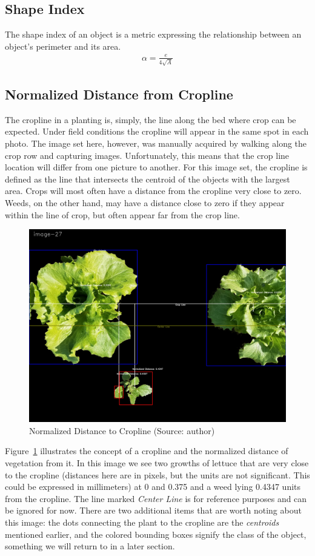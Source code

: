 \documentclass[letterpaper]{article}
\begin{document}
{\subsection{Shape Index}
The shape index of an object is a metric expressing the relationship between an object's perimeter and its area.
\begin{eqnarray*}
\alpha = \frac {e} {4 \sqrt{A}}
\end{eqnarray*}

\subsection{Normalized Distance from Cropline}
The cropline in a planting is, simply, the line along the bed where crop can be expected. Under field conditions the cropline will appear in the same spot in each photo. The image set here, however, was manually acquired by walking along the crop row and capturing images.  Unfortunately, this means that the crop line location will differ from one picture to another. For this image set, the cropline is defined as the line that intersects the centroid of the objects with the largest area. Crops will most often have a distance from the cropline very close to zero. Weeds, on the other hand, may have a distance close to zero if they appear within the line of crop, but often appear far from the crop line.
\begin{figure}[h!]
	\centering
	\includegraphics[width=0.4\linewidth]{./figures/normalized-distance.jpg}
	\caption{Normalized Distance to Cropline (Source: author)}
	\label{fig:normalized-distance}
\end{figure}
Figure~\ref{fig:normalized-distance} illustrates the concept of a cropline and the normalized distance of vegetation from it. In this image we see two growths of lettuce that are very close to the cropline (distances here are in pixels, but the units are not significant. This could be expressed in millimeters) at 0 and 0.375 and a weed lying 0.4347 units from the cropline. The line marked {\it Center Line} is for reference purposes and can be ignored for now.  There are two additional items that are worth noting about this image: the dots connecting the plant to the cropline are the {\it centroids} mentioned earlier, and the colored bounding boxes signify the class of the object, something we will return to in a later section.

}
\end{document}
